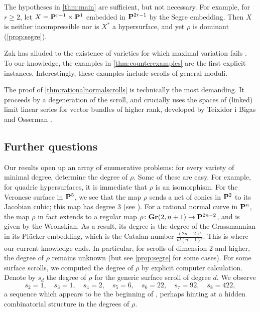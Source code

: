 The hypotheses in \autoref{thm:main} are sufficient, but not necessary.
For example, for $r \geq 2$, let $X = \P^{r-1} \times \P^1$ embedded in $\P^{2r-1}$ by the Segre embedding.
Then $X$ is neither incompressible nor is $X^*$ a hypersurface, and yet $\rho$ is dominant (\autoref{prop:segre}).

Zak has alluded to the existence of varieties for which maximal variation fails \cite{zak:} .
To our knowledge, the examples in \autoref{thm:counterexamples} are the first explicit instances.
Interestingly, these examples include scrolls of general moduli.

The proof of \autoref{thm:rationalnormalscrolls} is technically the most demanding.
It proceeds by a degeneration of the scroll, and crucially uses the spaces of (linked) limit linear series for vector bundles of higher rank, developed by Teixidor i Bigas \cite{tei-i-big:91} and Osserman \cite{oss:14}.

\subsection*{Further questions}
Our results open up an array of enumerative problems: for every variety of minimal degree, determine the degree of $\rho$.
Some of these are easy.
For example, for quadric hypersurfaces, it is immediate that $\rho$ is an isomorphism.
For the Veronese surface in $\P^5$, we see that the map $\rho$ sends a net of conics in $\P^2$ to its Jacobian cubic; this map has degree 3 (see \cite[Exercise~3.2 and 3.12]{dol:12}).
For a rational normal curve in $\P^n$, the map $\rho$ in fact extends to a regular map $\rho \from \Gr(2, n+1) \to \P^{2n-2}$, and is given by the Wronskian.
As a result, its degree is the degree of the Grassmannian in its Pl\"ucker embedding, which is the Catalan number $\frac{(2n-2)!}{n!(n-1)!}$.
This is where our current knowledge ends.
In particular, for scrolls of dimension 2 and higher, the degree of $\rho$ remains unknown (but see \autoref{prop:segre} for some cases).
For some surface scrolls, we computed the degree of $\rho$ by explicit computer calculation.
Denote by $s_d$ the degree of $\rho$ for the generic surface scroll of degree $d$.
We observe
\[ s_2 = 1, \quad s_3 = 1, \quad s_4 = 2,\quad s_5 = 6, \quad s_6 = 22, \quad s_7 = 92, \quad s_8 = 422,\]
a sequence which appears to be the beginning of \cite[A001181]{oei:}, perhaps hinting at a hidden combinatorial structure in the degrees of $\rho$.

